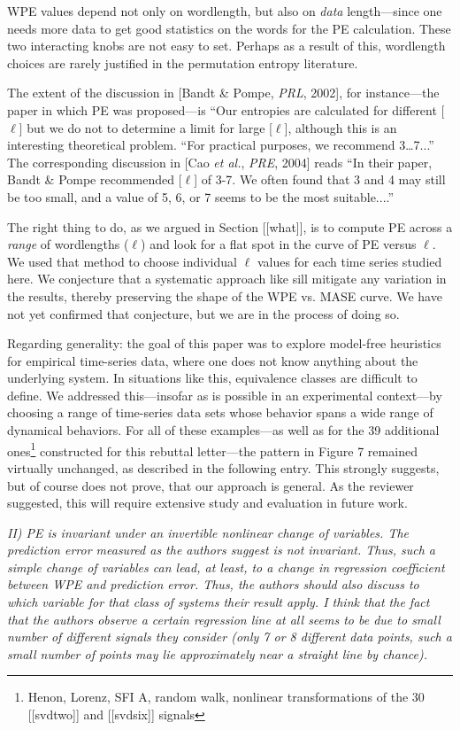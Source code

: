 \documentclass[12pt]{article}
\begin{document}
WPE values depend not only on wordlength, but also on \emph{data}
length---since one needs more data to get good statistics on the words
for the PE calculation.  These two interacting knobs are not easy to
set.  Perhaps as a result of this, wordlength choices are rarely
justified in the permutation entropy literature.

The extent of the discussion in [Bandt \& Pompe, {\sl PRL}, 2002], for
instance---the paper in which PE was proposed---is ``Our entropies are
calculated for different [$\ell$] but we do not to determine a limit
for large [$\ell$], although this is an interesting theoretical
problem.  ``For practical purposes, we recommend 3\dots7...''  The
corresponding discussion in [Cao {\sl et al.}, {\sl PRE}, 2004] reads
``In their paper, Bandt \& Pompe recommended [$\ell$] of 3-7.  We
often found that 3 and 4 may still be too small, and a value of 5, 6,
or 7 seems to be the most suitable....''

The right thing to do, as we argued in Section [[what]], is to compute
PE across a \emph{range} of wordlengths ($\ell$) and look for a flat
spot in the curve of PE versus $\ell$.  We used that method to choose
individual $\ell$ values for each time series studied here.  We
conjecture that a systematic approach like sill mitigate any variation
in the results, thereby preserving the shape of the WPE vs. MASE
curve.  We have not yet confirmed that conjecture, but we are in the
process of doing so.

Regarding generality: the goal of this paper was to explore model-free
heuristics for empirical time-series data, where one does not know
anything about the underlying system.  In situations like this,
equivalence classes are difficult to define.  We addressed
this---insofar as is possible in an experimental context---by choosing
a range of time-series data sets whose behavior spans a wide range of
dynamical behaviors.  For all of these examples---as well as for the
39 additional ones\footnote{Henon, Lorenz, SFI A, random walk,
  nonlinear transformations of the 30 [[svdtwo]] and [[svdsix]]
  signals} constructed for this rebuttal letter---the pattern in
Figure 7 remained virtually unchanged, as described in the following
entry.  This strongly suggests, but of course does not prove, that our
approach is general.  As the reviewer suggested, this will require
extensive study and evaluation in future work.

\smallskip

\emph{II) PE is invariant under an invertible nonlinear change of
  variables. The prediction error measured as the authors suggest is
  not invariant. Thus, such a simple change of variables can lead, at
  least, to a change in regression coefficient between WPE and
  prediction error. Thus, the authors should also discuss to which
  variable for that class of systems their result apply. I think that
  the fact that the authors observe a certain regression line at all
  seems to be due to small number of different signals they consider
  (only 7 or 8 different data points, such a small number of points
  may lie approximately near a straight line by chance).}
\end{document}
